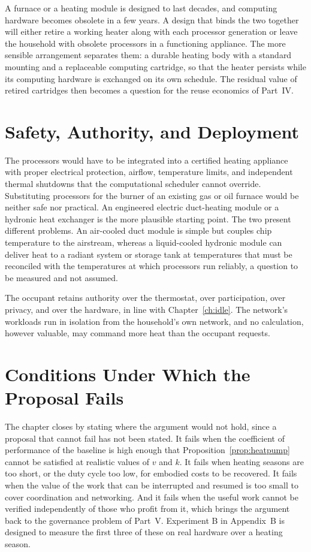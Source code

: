 A furnace or a heating module is designed to last decades, and computing hardware becomes obsolete in a few years. A design that binds the two together will either retire a working heater along with each processor generation or leave the household with obsolete processors in a functioning appliance. The more sensible arrangement separates them: a durable heating body with a standard mounting and a replaceable computing cartridge, so that the heater persists while its computing hardware is exchanged on its own schedule. The residual value of retired cartridges then becomes a question for the reuse economics of Part~IV.

\section{Safety, Authority, and Deployment}

The processors would have to be integrated into a certified heating appliance with proper electrical protection, airflow, temperature limits, and independent thermal shutdowns that the computational scheduler cannot override. Substituting processors for the burner of an existing gas or oil furnace would be neither safe nor practical. An engineered electric duct-heating module or a hydronic heat exchanger is the more plausible starting point. The two present different problems. An air-cooled duct module is simple but couples chip temperature to the airstream, whereas a liquid-cooled hydronic module can deliver heat to a radiant system or storage tank at temperatures that must be reconciled with the temperatures at which processors run reliably, a question to be measured and not assumed.

The occupant retains authority over the thermostat, over participation, over privacy, and over the hardware, in line with Chapter~\ref{ch:idle}. The network's workloads run in isolation from the household's own network, and no calculation, however valuable, may command more heat than the occupant requests.

\section{Conditions Under Which the Proposal Fails}

The chapter closes by stating where the argument would not hold, since a proposal that cannot fail has not been stated. It fails when the coefficient of performance of the baseline is high enough that Proposition~\ref{prop:heatpump} cannot be satisfied at realistic values of $v$ and $k$. It fails when heating seasons are too short, or the duty cycle too low, for embodied costs to be recovered. It fails when the value of the work that can be interrupted and resumed is too small to cover coordination and networking. And it fails when the useful work cannot be verified independently of those who profit from it, which brings the argument back to the governance problem of Part~V. Experiment B in Appendix~B is designed to measure the first three of these on real hardware over a heating season.
